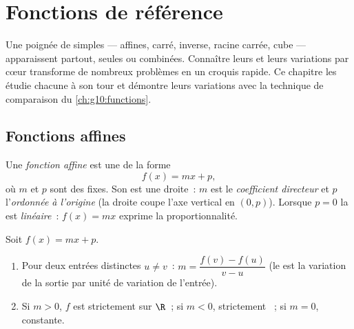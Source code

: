 \chapter{Fonctions de référence}\label{ch:g10:reffunc}

Une poignée de  simples --- affines, carré, inverse, racine
carrée, cube --- apparaissent partout, seules ou combinées. Connaître
leurs  et leurs variations par cœur transforme de nombreux
problèmes en un croquis rapide. Ce chapitre les étudie chacune à son
tour et démontre leurs variations avec la technique de comparaison du
\cref{ch:g10:functions}.

\section{Fonctions affines}

\begin{definition}\label{def:g10:reffunc:affine}
Une \emph{fonction affine} est une  de la
forme
\[
f(x) = mx + p,
\]
où $m$ et $p$ sont des  fixes. Son  est une
droite~: $m$ est le \emph{coefficient directeur} et $p$ l'\emph{ordonnée à l'origine} (la droite coupe l'axe vertical en $(0, p)$). Lorsque
$p = 0$ la  est \emph{linéaire}~: $f(x) = mx$ exprime la
proportionnalité.
\end{definition}

\begin{proposition}\label{prop:g10:reffunc:affine}
Soit $f(x) = mx + p$.
\begin{enumerate}
  \item Pour deux entrées distinctes $u \neq v$~:
        $m = \dfrac{f(v) - f(u)}{v - u}$ (le  est
        la variation de la sortie par unité de variation de l'entrée).
  \item Si $m > 0$, $f$ est strictement  sur $\R$~; si
        $m < 0$, strictement ~; si $m = 0$, constante.
\end{enumerate}
\end{proposition}

